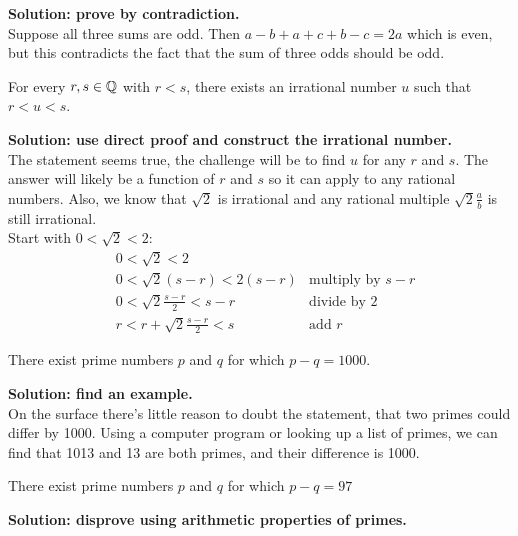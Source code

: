 \documentclass{article}
\begin{document}
\textbf{Solution: prove by contradiction.}
\\

Suppose all three sums are odd. Then $a - b + a + c + b - c = 2a$ which is even, but this contradicts the fact that the sum of three odds should be odd.

\begin{problem}
For every $r, s \in\mathbb{Q}$ with $r < s$, there exists an irrational number $u$ such that $r < u < s$.
\end{problem}

\textbf{Solution: use direct proof and construct the irrational number.}
\\

The statement seems true, the challenge will be to find $u$ for any $r$ and $s$. The answer will likely be a function of $r$ and $s$ so it can apply to any rational numbers. Also, we know that $\sqrt{2}$ is irrational and any rational multiple $\sqrt{2}\frac{a}{b}$ is still irrational.
\\

Start with $0 < \sqrt{2} < 2$:
\begin{align*}
   & 0 < \sqrt{2} < 2                  &                          \\
   & 0 < \sqrt{2}(s-r) < 2(s-r)        & \text{multiply by $s-r$} \\
   & 0 < \sqrt{2}\frac{s-r}{2} < s-r   & \text{divide by 2}       \\
   & r < r + \sqrt{2}\frac{s-r}{2} < s & \text{add $r$}
\end{align*}

\begin{problem}
There exist prime numbers $p$ and $q$ for which $p - q = 1000$.
\end{problem}

\textbf{Solution: find an example.}
\\

On the surface there's little reason to doubt the statement, that two primes could differ by 1000. Using a computer program or looking up a list of primes, we can find that 1013 and 13 are both primes, and their difference is 1000.

\begin{problem}
There exist prime numbers $p$ and $q$ for which $p - q = 97$
\end{problem}

\textbf{Solution: disprove using arithmetic properties of primes.}
\\
\end{document}
